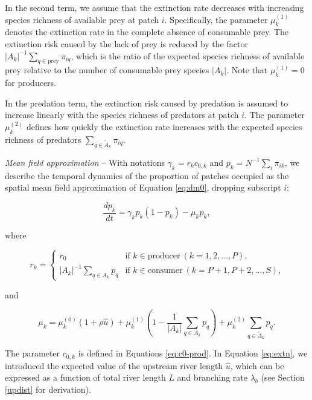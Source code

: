 \documentclass[11pt, class=article, crop=false]{standalone}
\theoremstyle{definition}
\begin{document}
In the second term, we assume that the extinction rate decreases with increasing species richness of available prey at patch $i$.
Specifically, the parameter $\mu_{k}^{(1)}$ denotes the extinction rate in the complete absence of consumable prey.
The extinction risk caused by the lack of prey is reduced by the factor $|A_k|^{-1} \sum_{q \in \text{prey}} \pi_{iq}$, which is the ratio of the expected species richness of available prey relative to the number of consumable prey species $|A_k|$.
Note that $\mu_{k}^{(1)} = 0$ for producers.

In the predation term, the extinction risk caused by predation is assumed to increase linearly with the species richness of predators at patch $i$.
The parameter $\mu_{k}^{(2)}$ defines how quickly the extinction rate increases with the expected species richness of predators $\sum_{q \in \tilde{A}_k} \pi_{iq}$.

\textit{Mean field approximation} --
With notations $\gamma_k = r_{k} c_{0, k}$ and $p_k = N^{-1} \sum_i \pi_{ik}$, we describe the temporal dynamics of the proportion of patches occupied as the spatial mean field approximation of Equation \ref{eq:dm0}, dropping subscript $i$:

\begin{equation}
    \frac{dp_k}{dt} = \gamma_k p_{k} (1 - p_{k}) - \mu_{k} p_{k},
    \label{eq:master}
\end{equation}

where

\begin{equation}
    r_{k} = 
    \begin{cases}
        r_0 & \text{if $k \in \text{producer}~(k = 1, 2, \ldots, P)$,}\\
        |A_k|^{-1} \sum_{q \in A_k} p_{q} & \text{if $k \in \text{consumer}~(k = P + 1, P + 2, \ldots, S)$,}
    \end{cases}
\end{equation}

and

\begin{equation}
    \mu_{k} = 
        \mu_{k}^{(0)} (1 + \rho \hat{u}) + 
        \mu_{k}^{(1)} \left(1 - \frac{1}{|A_k|}\sum_{q \in A_k} p_{q} \right) + 
        \mu_{k}^{(2)} \sum_{q \in \tilde{A}_k} p_{q}.
    \label{eq:extn}    
\end{equation}

The parameter $c_{0, k}$ is defined in Equations \ref{eq:c0-prod}. 
In Equation \ref{eq:extn}, we introduced the expected value of the upstream river length $\hat{u}$, which can be expressed as a function of total river length $L$ and branching rate $\lambda_b$ (see Section \ref{updist} for derivation).
\end{document}
